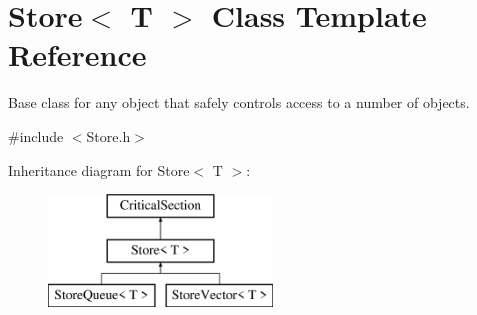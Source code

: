\hypertarget{class_store}{
\section{Store$<$ T $>$ Class Template Reference}
\label{class_store}
}


Base class for any object that safely controls access to a number of objects.  




{\ttfamily \#include $<$Store.h$>$}

Inheritance diagram for Store$<$ T $>$:\begin{figure}[H]
\begin{center}
\leavevmode
\includegraphics[height=3.000000cm]{class_store}
\end{center}
\end{figure}
